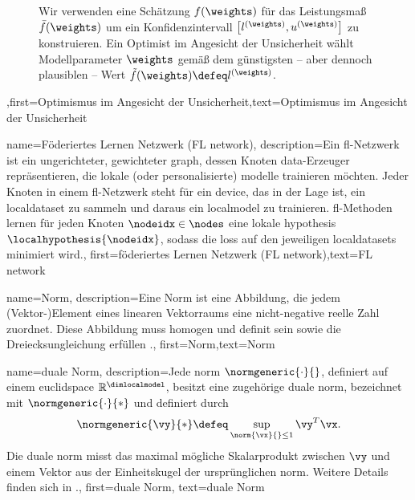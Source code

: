 {{{{\begin{figure}[htbp]
\begin{center}
				\caption{Wir verwenden eine Schätzung $f(\weights)$ für das Leistungsmaß $\bar{f}(\weights)$ 
					um ein Konfidenzintervall $\big[ l^{(\weights)},  u^{(\weights)} \big]$ zu konstruieren. Ein Optimist 
					im Angesicht der Unsicherheit wählt Modellparameter $\weights$ gemäß dem günstigsten –
					 aber dennoch plausiblen – Wert $\tilde{f}(\weights) \defeq l^{(\weights)}$.} 
			\end{center}
	\end{figure}},first={Optimismus im Angesicht der Unsicherheit},text={Optimismus im Angesicht der Unsicherheit} 

{
	name={Föderiertes Lernen Netzwerk (FL network)},
	description={Ein \gls{fl}-Netzwerk ist ein ungerichteter, 
	gewichteter \gls{graph}, dessen Knoten \gls{data}-Erzeuger repräsentieren, die lokale 
	(oder personalisierte) \gls{modelle} trainieren möchten. Jeder Knoten in einem \gls{fl}-Netzwerk steht 
	für ein \gls{device}, das in der Lage ist, ein \gls{localdataset} zu sammeln und daraus ein \gls{localmodel}
	 zu trainieren. \Gls{fl}-Methoden lernen für jeden Knoten $\nodeidx \in \nodes$ eine lokale \gls{hypothesis} $\localhypothesis{\nodeidx}$, 
	 sodass die \gls{loss} auf den jeweiligen \gls{localdataset}s minimiert wird.},
	first={föderiertes Lernen Netzwerk (FL network)},text={FL network} 
}


{
	name={Norm},
	description={Eine  Norm ist eine Abbildung, die jedem (Vektor-)Element eines linearen Vektorraums 
	eine nicht-negative reelle Zahl zuordnet. Diese Abbildung muss homogen und definit sein sowie die Dreiecksungleichung 
	erfüllen \cite{HornMatAnalysis}.},
	first={Norm},text={Norm} 
}


{
	name={duale Norm},
	description={Jede \gls{norm} $\normgeneric{\cdot}{}$, definiert auf einem \gls{euclidspace} $\mathbb{R}^{\dimlocalmodel}$, besitzt eine zugehörige duale \gls{norm}, bezeichnet mit $\normgeneric{\cdot}{*}$ und definiert durch
		\[
		\normgeneric{\vy}{*} \defeq \sup_{\norm{\vx}{} \leq 1} \vy^{T} \vx.
		\]
		Die duale \gls{norm} misst das maximal mögliche Skalarprodukt zwischen $\vy$ und einem Vektor aus der Einheitskugel der ursprünglichen \gls{norm}. Weitere Details finden sich in \cite[Abschnitt A.1.6]{BoydConvexBook}.},
	first={duale Norm},
	text={duale Norm}
}

}}}
